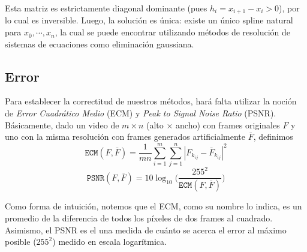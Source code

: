 Esta matriz es estrictamente diagonal dominante (pues $h_i = x_{i + 1} - x_i > 0$), por lo cual es inversible\cite{properties_of_diagonally_dominant_matrix}. Luego, la solución es única: existe un único spline natural para $x_0, \cdots, x_n$, la cual se puede encontrar utilizando métodos de resolución de sistemas de ecuaciones como eliminación gaussiana\cite{TP1}.

\subsection{Error}
Para establecer la correctitud de nuestros métodos, hará falta utilizar la noción de \emph{Error Cuadr\'atico Medio} (ECM) y \emph{Peak to Signal Noise Ratio} (PSNR). Básicamente, dado un video de $m \times n$ (alto $\times$ ancho) con frames originales $F$ y uno con la misma resolución con frames generados artificialmente $\bar{F}$, definimos  
$$\texttt{ECM}(F,\bar{F}) = \frac{1}{mn}\sum_{i=1}^m\sum_{j = 1}^n |F_{k_{ij}} - \bar{F}_{k_{ij}}|^2$$
$$\texttt{PSNR}(F,\bar{F}) = 10 \log_{10}\bigg(\frac{255^2}{\texttt{ECM}(F,\bar{F})}\bigg)$$

Como forma de intuición, notemos que el ECM, como su nombre lo indica, es un promedio de la diferencia de todos los píxeles de dos frames al cuadrado. Asimismo, el PSNR es el una medida de cuánto se acerca el error al máximo posible ($255^2$) medido en escala logarítmica.